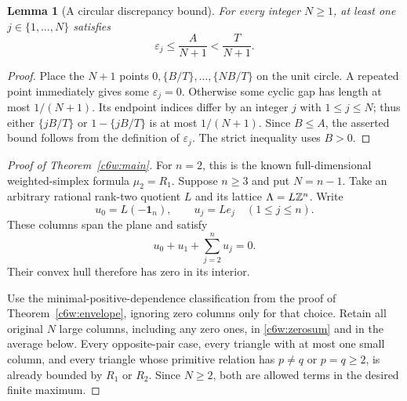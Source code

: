 \documentclass[11pt,a4paper]{article}
\newtheorem{lemma}[theorem]{Lemma}
\theoremstyle{remark}\newtheorem{remark}[theorem]{Remark}
\begin{document}
\begin{lemma}[A circular discrepancy bound]\label{c6w:circle}
For every integer $N\ge1$, at least one $j\in\{1,\ldots,N\}$
satisfies
\[
 \varepsilon_j\le\frac{A}{N+1}<\frac{T}{N+1}.
\]
\end{lemma}
\begin{proof}
Place the $N+1$ points
$0,\{B/T\},\ldots,\{NB/T\}$ on the unit circle.  A repeated
point immediately gives some $\varepsilon_j=0$.  Otherwise
some cyclic gap has length at most $1/(N+1)$.  Its endpoint
indices differ by an integer $j$ with $1\le j\le N$; thus
either $\{jB/T\}$ or $1-\{jB/T\}$ is at most $1/(N+1)$.
Since $B\le A$, the asserted bound follows from the definition
of $\varepsilon_j$.  The strict inequality uses $B>0$.
\end{proof}

\begin{proof}[Proof of Theorem~\ref{c6w:main}]
For $n=2$, this is the known full-dimensional weighted-simplex
formula $\mu_2=R_1$.
Suppose $n\ge3$ and put $N=n-1$.  Take an arbitrary rational
rank-two quotient $L$ and its lattice $\Lambda=L\mathbb Z^n$.  Write
\[
 u_0=L(-\mathbf1_n),\qquad u_j=Le_j\quad(1\le j\le n).
\]
These columns span the plane and satisfy
\begin{equation}\label{c6w:zerosum}
 u_0+u_1+\sum_{j=2}^n u_j=0.
\end{equation}
Their convex hull therefore has zero in its interior.

Use the minimal-positive-dependence classification from the
proof of Theorem~\ref{c6w:envelope}, ignoring zero columns only
for that choice.  Retain all original $N$ large columns,
including any zero ones, in \eqref{c6w:zerosum} and in the
average below.  Every opposite-pair case,
every triangle with at most one small column, and every triangle
whose primitive relation has $p\ne q$ or $p=q\ge2$, is already
bounded by $R_1$ or $R_2$.  Since $N\ge2$, both are allowed
terms in the desired finite maximum.


\end{proof}
\end{document}
